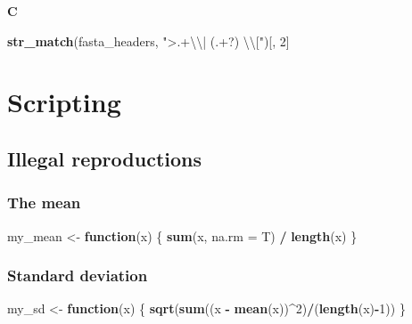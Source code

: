 \documentclass[]{book}
\newenvironment{Shaded}{\begin{snugshade}}{\end{snugshade}}
\newcommand{\CharTok}[1]{\textcolor[rgb]{0.31,0.60,0.02}{#1}}
\newcommand{\ControlFlowTok}[1]{\textcolor[rgb]{0.13,0.29,0.53}{\textbf{#1}}}
\newcommand{\DataTypeTok}[1]{\textcolor[rgb]{0.13,0.29,0.53}{#1}}
\newcommand{\DecValTok}[1]{\textcolor[rgb]{0.00,0.00,0.81}{#1}}
\newcommand{\KeywordTok}[1]{\textcolor[rgb]{0.13,0.29,0.53}{\textbf{#1}}}
\newcommand{\NormalTok}[1]{#1}
\newcommand{\OperatorTok}[1]{\textcolor[rgb]{0.81,0.36,0.00}{\textbf{#1}}}
\newcommand{\StringTok}[1]{\textcolor[rgb]{0.31,0.60,0.02}{#1}}
\begin{document}
\textbf{C}

\begin{Shaded}
\begin{Highlighting}[]
\KeywordTok{str_match}\NormalTok{(fasta_headers, }\StringTok{">.+}\CharTok{\textbackslash{}\textbackslash{}}\StringTok{| (.+?) }\CharTok{\textbackslash{}\textbackslash{}}\StringTok{["}\NormalTok{)[, }\DecValTok{2}\NormalTok{]}
\end{Highlighting}
\end{Shaded}

\hypertarget{scripting-3}{%
\section{Scripting}\label{scripting-3}}

\hypertarget{illegal-reproductions-1}{%
\subsection{Illegal reproductions}\label{illegal-reproductions-1}}

\hypertarget{the-mean-1}{%
\subsubsection*{The mean}\label{the-mean-1}}

\begin{Shaded}
\begin{Highlighting}[]
\NormalTok{my_mean <-}\StringTok{ }\ControlFlowTok{function}\NormalTok{(x) \{}
        \KeywordTok{sum}\NormalTok{(x, }\DataTypeTok{na.rm =}\NormalTok{ T) }\OperatorTok{/}\StringTok{ }\KeywordTok{length}\NormalTok{(x)}
\NormalTok{\}}
\end{Highlighting}
\end{Shaded}

\hypertarget{standard-deviation-1}{%
\subsubsection*{Standard deviation}\label{standard-deviation-1}}

\begin{Shaded}
\begin{Highlighting}[]
\NormalTok{my_sd <-}\StringTok{ }\ControlFlowTok{function}\NormalTok{(x) \{}
        \KeywordTok{sqrt}\NormalTok{(}\KeywordTok{sum}\NormalTok{((x }\OperatorTok{-}\StringTok{ }\KeywordTok{mean}\NormalTok{(x))}\OperatorTok{^}\DecValTok{2}\NormalTok{)}\OperatorTok{/}\NormalTok{(}\KeywordTok{length}\NormalTok{(x)}\OperatorTok{-}\DecValTok{1}\NormalTok{))}
\NormalTok{\}}
\end{Highlighting}
\end{Shaded}
\end{document}
